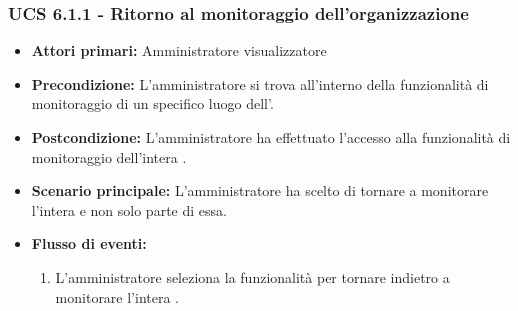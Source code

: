 \subsubsection{UCS 6.1.1 - Ritorno al monitoraggio dell'organizzazione}
	\begin{itemize}
	\item \textbf{Attori primari:} Amministratore visualizzatore
	\item \textbf{Precondizione:} L'amministratore si trova all'interno della funzionalità di monitoraggio di un specifico luogo dell'.
	\item \textbf{Postcondizione:} L'amministratore ha effettuato l'accesso alla funzionalità di monitoraggio dell'intera .
	\item \textbf{Scenario principale:} L'amministratore ha scelto di tornare a monitorare l'intera  e non solo parte di essa.
	\item \textbf{Flusso di eventi:}
    \begin{enumerate}
        \item  L'amministratore seleziona la funzionalità per tornare indietro a monitorare l'intera .
    \end{enumerate}
	\end{itemize}

